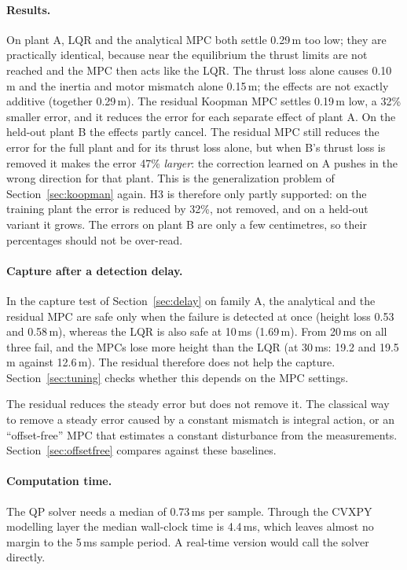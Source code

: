\paragraph{Results.} On plant A, LQR and the analytical MPC both settle 0.29\,m too low; they are practically identical, because near the equilibrium the thrust limits are not reached and the MPC then acts like the LQR. The thrust loss alone causes 0.10\,m and the inertia and motor mismatch alone 0.15\,m; the effects are not exactly additive (together 0.29\,m). The residual Koopman MPC settles 0.19\,m low, a 32\% smaller error, and it reduces the error for each separate effect of plant A. On the held-out plant B the effects partly cancel. The residual MPC still reduces the error for the full plant and for its thrust loss alone, but when B's thrust loss is removed it makes the error 47\% \emph{larger}: the correction learned on A pushes in the wrong direction for that plant. This is the generalization problem of Section~\ref{sec:koopman} again. H3 is therefore only partly supported: on the training plant the error is reduced by 32\%, not removed, and on a held-out variant it grows. The errors on plant B are only a few centimetres, so their percentages should not be over-read.

\paragraph{Capture after a detection delay.} In the capture test of Section~\ref{sec:delay} on family A, the analytical and the residual MPC are safe only when the failure is detected at once (height loss 0.53 and 0.58\,m), whereas the LQR is also safe at 10\,ms (1.69\,m). From 20\,ms on all three fail, and the MPCs lose more height than the LQR (at 30\,ms: 19.2 and 19.5\,m against 12.6\,m). The residual therefore does not help the capture. Section~\ref{sec:tuning} checks whether this depends on the MPC settings.

The residual reduces the steady error but does not remove it. The classical way to remove a steady error caused by a constant mismatch is integral action, or an ``offset-free'' MPC that estimates a constant disturbance from the measurements. Section~\ref{sec:offsetfree} compares against these baselines.

\paragraph{Computation time.} The QP solver needs a median of 0.73\,ms per sample. Through the CVXPY modelling layer the median wall-clock time is 4.4\,ms, which leaves almost no margin to the 5\,ms sample period. A real-time version would call the solver directly.

